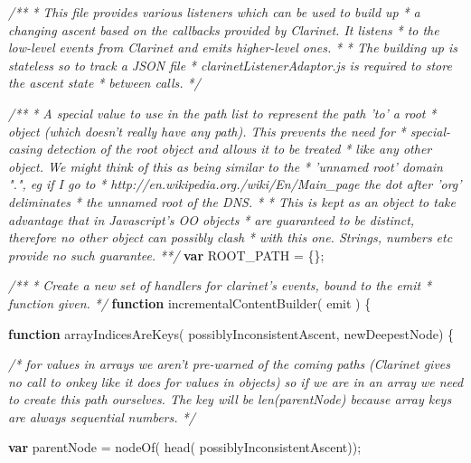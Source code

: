 \documentclass[12pt, ]{article}
\newenvironment{Shaded}{}{}
\newcommand{\KeywordTok}[1]{\textcolor[rgb]{0.00,0.44,0.13}{\textbf{{#1}}}}
\newcommand{\CommentTok}[1]{\textcolor[rgb]{0.38,0.63,0.69}{\textit{{#1}}}}
\newcommand{\FunctionTok}[1]{\textcolor[rgb]{0.02,0.16,0.49}{{#1}}}
\newcommand{\NormalTok}[1]{{#1}}
\begin{document}
\begin{Shaded}
\begin{Highlighting}[]
\CommentTok{/** }
\CommentTok{ * This file provides various listeners which can be used to build up}
\CommentTok{ * a changing ascent based on the callbacks provided by Clarinet. It listens}
\CommentTok{ * to the low-level events from Clarinet and emits higher-level ones.}
\CommentTok{ *  }
\CommentTok{ * The building up is stateless so to track a JSON file}
\CommentTok{ * clarinetListenerAdaptor.js is required to store the ascent state}
\CommentTok{ * between calls.}
\CommentTok{ */}



\CommentTok{/** }
\CommentTok{ * A special value to use in the path list to represent the path 'to' a root }
\CommentTok{ * object (which doesn't really have any path). This prevents the need for }
\CommentTok{ * special-casing detection of the root object and allows it to be treated }
\CommentTok{ * like any other object. We might think of this as being similar to the }
\CommentTok{ * 'unnamed root' domain ".", eg if I go to }
\CommentTok{ * http://en.wikipedia.org./wiki/En/Main_page the dot after 'org' deliminates }
\CommentTok{ * the unnamed root of the DNS.}
\CommentTok{ * }
\CommentTok{ * This is kept as an object to take advantage that in Javascript's OO objects }
\CommentTok{ * are guaranteed to be distinct, therefore no other object can possibly clash }
\CommentTok{ * with this one. Strings, numbers etc provide no such guarantee. }
\CommentTok{ **/}
\KeywordTok{var} \NormalTok{ROOT_PATH = \{\};}


\CommentTok{/**}
\CommentTok{ * Create a new set of handlers for clarinet's events, bound to the emit }
\CommentTok{ * function given.  }
\CommentTok{ */} 
\KeywordTok{function} \FunctionTok{incrementalContentBuilder}\NormalTok{( emit ) \{}


   \KeywordTok{function} \FunctionTok{arrayIndicesAreKeys}\NormalTok{( possiblyInconsistentAscent, newDeepestNode) \{}
   
      \CommentTok{/* for values in arrays we aren't pre-warned of the coming paths }
\CommentTok{         (Clarinet gives no call to onkey like it does for values in objects) }
\CommentTok{         so if we are in an array we need to create this path ourselves. The }
\CommentTok{         key will be len(parentNode) because array keys are always sequential }
\CommentTok{         numbers. */}

      \KeywordTok{var} \NormalTok{parentNode = }\FunctionTok{nodeOf}\NormalTok{( }\FunctionTok{head}\NormalTok{( possiblyInconsistentAscent));}
      

\end{Highlighting}
\end{Shaded}
\end{document}
